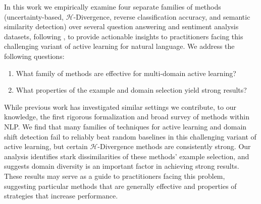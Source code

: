 In this work we empirically examine four separate families of methods (uncertainty-based, $\mathcal{H}$-Divergence, reverse classification accuracy, and semantic similarity detection) over several question answering and sentiment analysis datasets, following \citep{lowell2019practical, elsahar-galle-2019-annotate}, to provide actionable insights to practitioners facing this challenging variant of active learning for natural language.
We address the following questions:
\respace
\begin{enumerate}\itemsep0em
  \item What family of methods are effective for multi-domain active learning?
  \item What properties of the example and domain selection yield strong results?
\end{enumerate}
\respace
While previous work has investigated similar settings \citep{10.1007/978-3-642-23808-6_7, Liu_Reyzin_Ziebart_2015, pmlr-v130-zhao21b, kirsch2021active} we contribute, to our knowledge, the first rigorous formalization and broad survey of methods within NLP.
We find that many families of techniques for active learning and domain shift detection fail to reliably beat random baselines in this challenging variant of active learning, but certain $\mathcal{H}$-Divergence methods are consistently strong.
Our analysis identifies stark dissimilarities of these methods' example selection, and suggests domain diversity is an important factor in achieving strong results.
These results may serve as a guide to practitioners facing this problem, suggesting particular methods that are generally effective and properties of strategies that increase performance.